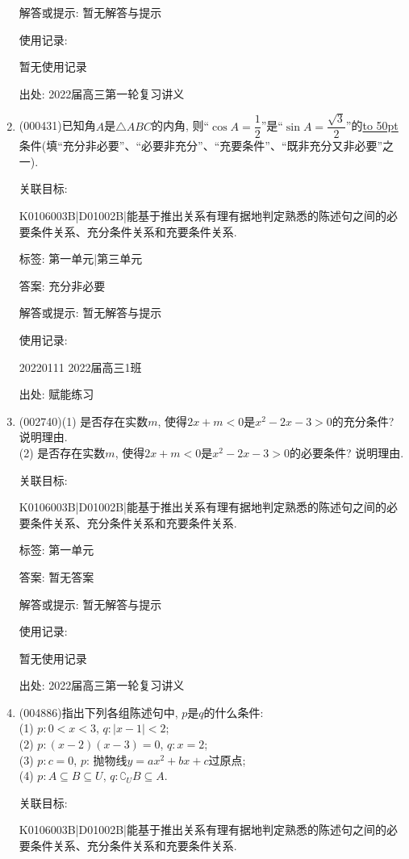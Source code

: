 \documentclass[10pt,a4paper]{article}
\newcommand{\blank}[1]{\underline{\hbox to #1pt{}}}
\begin{document}
\begin{enumerate}[1.]
解答或提示: 暂无解答与提示

使用记录:

暂无使用记录


出处: 2022届高三第一轮复习讲义
\item { (000431)}已知角$A$是$\triangle ABC$的内角, 则``$\cos A=\dfrac12$''是``$\sin A=\dfrac{\sqrt3}2$''的\blank{50}条件(填``充分非必要''、``必要非充分''、``充要条件''、``既非充分又非必要''之一).


关联目标:

K0106003B|D01002B|能基于推出关系有理有据地判定熟悉的陈述句之间的必要条件关系、充分条件关系和充要条件关系.



标签: 第一单元|第三单元

答案: 充分非必要

解答或提示: 暂无解答与提示

使用记录:

20220111	2022届高三1班	


出处: 赋能练习
\item { (002740)}(1) 是否存在实数$m$, 使得$2x+m<0$是${x^2}-2x-3>0$的充分条件? 说明理由.\\
(2) 是否存在实数$m$, 使得$2x+m<0$是$x^2-2x-3>0$的必要条件? 说明理由.


关联目标:

K0106003B|D01002B|能基于推出关系有理有据地判定熟悉的陈述句之间的必要条件关系、充分条件关系和充要条件关系.



标签: 第一单元

答案: 暂无答案

解答或提示: 暂无解答与提示

使用记录:

暂无使用记录


出处: 2022届高三第一轮复习讲义
\item { (004886)}指出下列各组陈述句中, $p$是$q$的什么条件:\\
(1) $p:0<x<3$, $q:|x-1|<2$;\\
(2) $p:(x-2)(x-3)=0$, $q:x=2$;\\
(3) $p:c=0$, $p$: 抛物线$y=ax^2+bx+c$过原点;\\
(4) $p:A\subseteq B\subseteq U$, $q:\complement_UB\subseteq A$.


关联目标:

K0106003B|D01002B|能基于推出关系有理有据地判定熟悉的陈述句之间的必要条件关系、充分条件关系和充要条件关系.




\end{enumerate}
\end{document}
